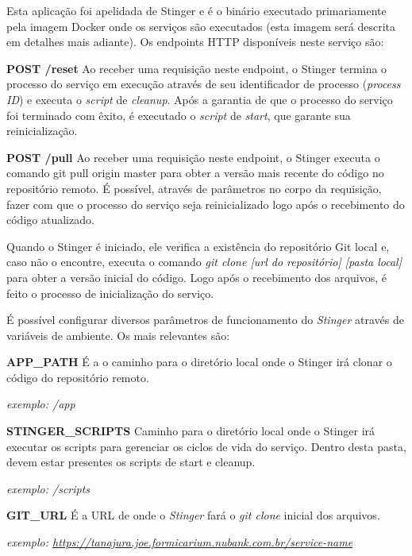 	Esta aplicação foi apelidada de Stinger e é o binário executado primariamente pela imagem Docker onde os serviços são executados (esta imagem será descrita em detalhes mais adiante). Os endpoints HTTP disponíveis neste serviço são:

    \textbf{POST /reset}
	\newline
	Ao receber uma requisição neste endpoint, o Stinger termina o processo do serviço em execução através de seu identificador de processo (\textit{process ID}) e executa o \textit{script} de \textit{cleanup}. Após a garantia de que o processo do serviço foi terminado com êxito, é executado o \textit{script} de \textit{start}, que garante sua reinicialização.
	
	\textbf{POST /pull}
	\newline
	Ao receber uma requisição neste endpoint, o Stinger executa o comando git pull origin master para obter a versão mais recente do código no repositório remoto. É possível, através de parâmetros no corpo da requisição, fazer com que o processo do serviço seja reinicializado logo após o recebimento do código atualizado.

	Quando o Stinger é iniciado, ele verifica a existência do repositório Git local e, caso não o encontre, executa o comando \textit{git clone [url do repositório] [pasta local]} para obter a versão inicial do código. Logo após o recebimento dos arquivos, é feito o processo de inicialização do serviço.

	É possível configurar diversos parâmetros de funcionamento do \textit{Stinger} através de variáveis de ambiente. Os mais relevantes são:
	
	\textbf{APP\_PATH}
	\newline
	É a o caminho para o diretório local onde o Stinger irá clonar o código do repositório remoto.
	
	\textit{exemplo: /app}

	\textbf{STINGER\_SCRIPTS}
	\newline
	Caminho para o diretório local onde o Stinger irá executar os scripts para gerenciar os ciclos de vida do serviço. Dentro desta pasta, devem estar presentes os scripts de start e cleanup.
	
	\textit{exemplo: /scripts}
	
	\textbf{GIT\_URL}
	\newline
	É a URL de onde o \textit{Stinger} fará o \textit{git clone} inicial dos arquivos.
	
	\textit{exemplo: \url{https://tanajura.joe.formicarium.nubank.com.br/service-name}}
	
